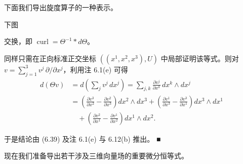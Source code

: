 下面我们导出旋度算子的一种表示。

\begin{proposition}

下图


交换，即 $ \operatorname{curl} = \Theta^{-1}\ast d\Theta $。

\proofhead
同样只需在正向标准正交坐标 $ ((x^{1},x^{2},x^{3}),U) $ 中局部证明该等式。则对 $ v = \sum_{j=1}^{3} v^{j}\, \partial/\partial x^{j} $，利用注 6.1(e) 可得
\begin{equation*}
\begin{aligned}
d(\Theta v) &= d\left(\sum_{j} v^{j}\, dx^{j}\right) = \sum_{j,k}\frac{\partial v^{j}}{\partial x^{k}}\, dx^{k}\wedge dx^{j} \\ &= \left(\frac{\partial v^{3}}{\partial x^{2}} - \frac{\partial v^{2}}{\partial x^{3}}\right) dx^{2}\wedge dx^{3} + \left(\frac{\partial v^{1}}{\partial x^{3}} - \frac{\partial v^{3}}{\partial x^{1}}\right) dx^{3}\wedge dx^{1} \\ &\quad + \left(\frac{\partial v^{2}}{\partial x^{1}} - \frac{\partial v^{1}}{\partial x^{2}}\right) dx^{1}\wedge dx^{2} .
\end{aligned}
\end{equation*}

于是结论由 (6.39) 及注 6.1(e) 与 6.12(b) 推出。 \nobreak\hspace{0.35em}■

\end{proposition}

现在我们准备导出若干涉及三维向量场的重要微分恒等式。

